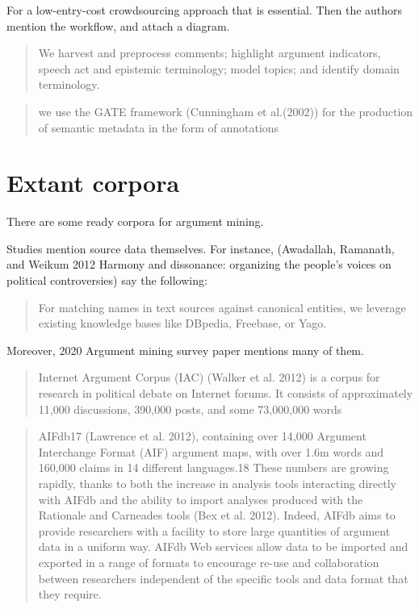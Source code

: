 \documentclass{report}
\begin{document}
For a low-entry-cost crowdsourcing approach that is essential.
Then the authors mention the workflow, and attach a diagram.
\begin{quote}
 We harvest and preprocess comments; highlight argument indicators, speech act and epistemic terminology; model topics; and identify domain terminology.
\end{quote}
\cite[page 78]{wyner_argument_2015}
\begin{quote}
 we use the GATE framework (Cunningham et al.(2002)) for the production of semantic metadata in the form of annotations
\end{quote}
\cite[page 79]{wyner_argument_2015}

\section{Extant corpora}
There are some ready corpora for argument mining.

Studies mention source data themselves. 
For instance, (Awadallah, Ramanath, and Weikum 2012 Harmony and dissonance: organizing the people's voices on political controversies) \cite{awadallah_harmony_2012}
say the following:
\begin{quote}
 For matching names in text sources against canonical entities, we leverage existing knowledge bases like DBpedia, Freebase, or Yago.
\end{quote} \cite[page 532]{awadallah_harmony_2012}

Moreover, 2020 Argument mining survey paper \cite{lawrence_argument_2020} mentions many of them.

\begin{quote}
 Internet Argument Corpus (IAC) (Walker et al. 2012) is a corpus for research in political debate on Internet forums. It consists of approximately 11,000 discussions, 390,000 posts, and some 73,000,000 words
\end{quote}\cite[page 782]{lawrence_argument_2020}
\begin{quote}
 AIFdb17 (Lawrence et al. 2012), containing over 14,000 Argument Interchange Format (AIF) argument maps, with over 1.6m words and 160,000 claims in 14 different languages.18 These numbers are growing rapidly, thanks to both the increase in analysis tools interacting directly with AIFdb and the ability to import analyses produced with the Rationale and Carneades tools (Bex et al. 2012). Indeed, AIFdb aims to provide researchers with a facility to store large quantities of argument data in a uniform way. AIFdb Web services allow data to be imported and exported in a range of formats to encourage re-use and collaboration between researchers independent of the specific tools and data format that they require.
\end{quote}
\cite[page 783]{lawrence_argument_2020}
\end{document}
